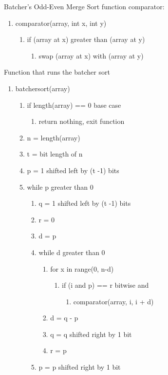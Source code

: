 \documentclass[11pt]{article}
\begin{document}
Batcher's Odd-Even Merge Sort
function comparator:
\begin{enumerate}
\item comparator(array, int x, int y)
	\begin{enumerate}
	\item if (array at x) greater than (array at y)
		\begin{enumerate}
		\item swap (array at x) with (array at y)
		\end{enumerate}
	\end{enumerate}
\end{enumerate}
Function that runs the batcher sort
\begin{enumerate}
\item batchersort(array)
	\begin{enumerate}
	\item if length(array) == 0 base case
		\begin{enumerate}
		\item return nothing, exit function
		\end{enumerate}
	\item n = length(array)
	\item t = bit length of n
	\item p = 1 shifted left by (t -1) bits
	\item while p greater than 0
		\begin{enumerate}
		\item q = 1 shifted left by (t -1) bits
		\item r = 0
		\item d = p
		\item while d greater than 0
			\begin{enumerate}
			\item for x in range(0, n-d)
				\begin{enumerate}
					\item if (i and p) == r  bitwise and
					\begin{enumerate}
					\item comparator(array, i, i + d)
					\end{enumerate}
				\end{enumerate}
			\item d = q - p
			\item q = q shifted right by 1 bit
			\item r = p
			\end{enumerate}
		\item p = p shifted right by 1 bit
		\end{enumerate}
	\end{enumerate}
\end{enumerate}
\end{document}
